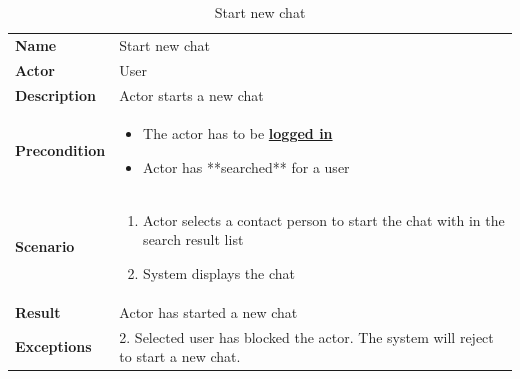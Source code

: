 \begin{table}[ht]
    \caption{Start new chat}
    \begin{tabular}{|L{5cm}|L{10cm}|}
        \toprule
        \textbf{Name}        & Start new chat               \\
        \textbf{Actor}       & User                         \\
        \textbf{Description} & Actor starts a new chat      \\
        \textbf{Precondition} &
        \vspace{-0.75cm}
        \begin{itemize}
            \setlength\itemsep{-0.5em}
            \item The actor has to be \textbf{\hyperref[tab:table8]{logged in}}
            \item Actor has **searched** for a user %
        \end{itemize} \\[-0.5cm]
        \textbf{Scenario} &
        \vspace{-0.75cm}
        \begin{enumerate}
            \setlength\itemsep{-0.5em}
            \item Actor selects a contact person to start the chat with in the search result list
            \item System displays the chat
        \end{enumerate} \\[-0.5cm]
        \textbf{Result}      & Actor has started a new chat \\
        \textbf{Exceptions} & 2.
        Selected user has blocked the actor.
        The system will reject to start a new chat. \\
        \bottomrule
    \end{tabular}
    \label{tab:table17}
\end{table}

